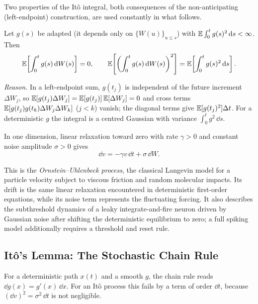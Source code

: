 Two properties of the It\^o integral, both consequences of the non-anticipating (left-endpoint) construction, are used constantly in what follows.

\begin{proposition}
\label{prop:ito-isometry}
Let $g(s)$ be adapted (it depends only on $\{W(u)\}_{u\le s}$) with $\operatorname{\mathbb{E}}\int_0^t g(s)^2\,\mathrm{d} s<\infty$. Then
\[
\operatorname{\mathbb{E}}\!\left[\int_0^t g(s)\,\mathrm{d} W(s)\right]=0,
\qquad
\operatorname{\mathbb{E}}\!\left[\left(\int_0^t g(s)\,\mathrm{d} W(s)\right)^{2}\right]=\operatorname{\mathbb{E}}\!\left[\int_0^t g(s)^2\,\mathrm{d} s\right].
\]
\end{proposition}

\noindent\emph{Reason.} In a left-endpoint sum, $g(t_j)$ is independent of the future increment $\Delta W_j$, so $\operatorname{\mathbb{E}}[g(t_j)\Delta W_j]=\operatorname{\mathbb{E}}[g(t_j)]\operatorname{\mathbb{E}}[\Delta W_j]=0$ and cross terms $\operatorname{\mathbb{E}}[g(t_j)g(t_k)\Delta W_j\Delta W_k]$ ($j<k$) vanish; the diagonal terms give $\operatorname{\mathbb{E}}[g(t_j)^2]\Delta t$. For a deterministic $g$ the integral is a centred Gaussian with variance $\int_0^t g^2\,\dd s$.

\begin{example}
\label{ex:ornstein-uhlenbeck}
In one dimension, linear relaxation toward zero with rate $\gamma>0$ and constant noise amplitude $\sigma>0$ gives
\begin{equation}
\dd v=-\gamma v\,\dd t+\sigma\,\dd W.
\end{equation}

This is the \emph{Ornstein--Uhlenbeck process}, the classical Langevin model for a particle velocity subject to viscous friction and random molecular impacts. Its drift is the same linear relaxation encountered in deterministic first-order equations, while its noise term represents the fluctuating forcing. It also describes the subthreshold dynamics of a leaky integrate-and-fire neuron driven by Gaussian noise after shifting the deterministic equilibrium to zero; a full spiking model additionally requires a threshold and reset rule.
\end{example}

\subsection{It\^o's Lemma: The Stochastic Chain Rule}
\label{sec:ito-lemma}

For a deterministic path $x(t)$ and a smooth $g$, the chain rule reads $\dd g(x)=g'(x)\,\dd x$. For an It\^o process this fails by a term of order $\dd t$, because $(\dd v)^2=\sigma^2\,\dd t$ is not negligible.


